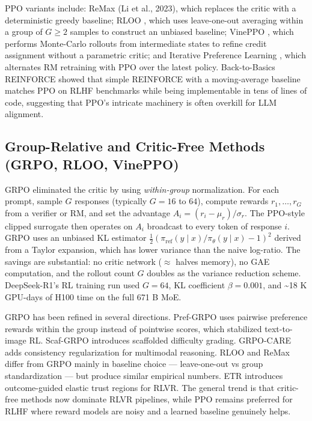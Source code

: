 \documentclass{article}
\begin{document}
PPO variants include: ReMax (Li et al., 2023), which replaces the critic with a deterministic greedy baseline; RLOO \citep{ahmadian2024backtobasicsrevisi}, which uses leave-one-out averaging within a group of \(G \ge 2\) samples to construct an unbiased baseline; VinePPO \citep{kazemnejad2024vineppounlockingrl}, which performs Monte-Carlo rollouts from intermediate states to refine credit assignment without a parametric critic; and Iterative Preference Learning \citep{xiong2023iterativepreferenc}, which alternates RM retraining with PPO over the latest policy. Back-to-Basics REINFORCE \citep{ahmadian2024backtobasicsrevisi} showed that simple REINFORCE with a moving-average baseline matches PPO on RLHF benchmarks while being implementable in tens of lines of code, suggesting that PPO's intricate machinery is often overkill for LLM alignment.

\subsection{Group-Relative and Critic-Free Methods (GRPO, RLOO, VinePPO)}\label{group-relative-and-critic-free-methods-grpo-rloo-vineppo}

GRPO \citep{shao20242024} eliminated the critic by using \emph{within-group} normalization. For each prompt, sample \(G\) responses (typically \(G = 16\) to \(64\)), compute rewards \(r_1, \ldots, r_G\) from a verifier or RM, and set the advantage \(A_i = (r_i - \mu_r)/\sigma_r\). The PPO-style clipped surrogate then operates on \(A_i\) broadcast to every token of response \(i\). GRPO uses an unbiased KL estimator \(\tfrac{1}{2}(\pi_{\text{ref}}(y\mid x)/\pi_\theta(y\mid x) - 1)^2\) derived from a Taylor expansion, which has lower variance than the naive log-ratio. The savings are substantial: no critic network (\(\approx\) halves memory), no GAE computation, and the rollout count \(G\) doubles as the variance reduction scheme. DeepSeek-R1's RL training run used \(G = 64\), KL coefficient \(\beta = 0.001\), and \textasciitilde18 K GPU-days of H100 time on the full 671 B MoE.

GRPO has been refined in several directions. Pref-GRPO \citep{wang20252025} uses pairwise preference rewards within the group instead of pointwise scores, which stabilized text-to-image RL. Scaf-GRPO \citep{zhang20252025} introduces scaffolded difficulty grading. GRPO-CARE \citep{chen20252025} adds consistency regularization for multimodal reasoning. RLOO \citep{ahmadian2024backtobasicsrevisi} and ReMax differ from GRPO mainly in baseline choice --- leave-one-out vs group standardization --- but produce similar empirical numbers. ETR \citep{zhang20262026} introduces outcome-guided elastic trust regions for RLVR. The general trend is that critic-free methods now dominate RLVR pipelines, while PPO remains preferred for RLHF where reward models are noisy and a learned baseline genuinely helps.
\end{document}
